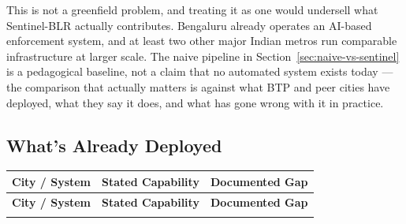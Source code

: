 \documentclass[11pt,a4paper]{article}
\begin{document}
This is not a greenfield problem, and treating it as one would undersell what Sentinel-BLR actually contributes. Bengaluru already operates an AI-based enforcement system, and at least two other major Indian metros run comparable infrastructure at larger scale. The naive pipeline in Section~\ref{sec:naive-vs-sentinel} is a pedagogical baseline, not a claim that no automated system exists today --- the comparison that actually matters is against what BTP and peer cities have deployed, what they say it does, and what has gone wrong with it in practice.

\subsection*{What's Already Deployed}

\begin{longtable}{L{3.3cm} L{5.8cm} L{6.2cm}}
    \toprule
    \color{white}\textbf{City / System} & \color{white}\textbf{Stated Capability} & \color{white}\textbf{Documented Gap} \\
    \midrule
    \endfirsthead
    \toprule
    \color{white}\textbf{City / System} & \color{white}\textbf{Stated Capability} & \color{white}\textbf{Documented Gap} \\
    \midrule
    \endhead
    \bottomrule
    \endfoot


\end{longtable}
\end{document}
